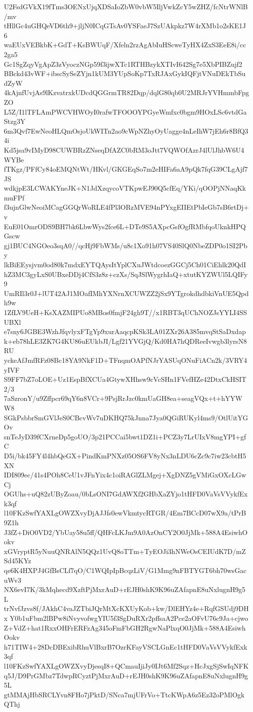 U2FsdGVkX19fTms3OENxUjqXDSaIoZbW0vbW5IljVwkZcY5wZHZ/fcNtrWNlB/mv
tHllGc4uGHQeVD6th9+jljN0ICqGTsAv0YSFaeJ7SzUAkpkz7W4rXMb1o2sKE1J6
waEUxVEBkbK+GdT+KsBWUqF/Xfeln2rzAgAbIuHScweTyHX4ZxS3EeE8i/cc2ga5
Gc1SgZqyVgApZ3zVyoczNGp59f3ijwXTc1RTHBzykXTIvI642Sg7e5XbPIBZujf2
BBckd43vWF+ibscSySeZYjn1kUM3YUpSoKp7TxRJAxGykIQFjtVNuDEkTbSudZyW
4kAjnfUvjAs9lKzvatrxkUDcdQGGrmTR82Dqp/dqlG80qb0U2MRJrYVHmmbFpgZO
L5Z/I1lTFLAmPWCVHWOyI0rafwTFOOOYPGyeWmfxc0bgm9HOxLSc6vtdGaStzg3Y
6m3Qvf7EwNeoHLQmOsjoUkWITn2ao9cWpNZhyOyUagge4nLeIhW7jEh6r8BfQ34i
Kd5jsa9vIMyD98CUWBRzZNseqDfAZC0bRM3oJtt7VQWOfAzrJ4lUlJhbW6U4WYBe
fTKgz/PFfCy84oEMQNtWt/HKvl/GKGEqSo7m2eHIFa6aA9pQk7fqG39CLgAjf7JS
wdkjpE3LCWAKYneJK+N1JdXzqycoVTKpwEJ90Q5cfEq/YKi/qOOPjNNaqKkmuFPf
f3ujnGlwNeoiMCagGGQrWoRLE4fPl3ORzMVE94nPYxgEIIEtPbIeGb7sB6rtDj+v
EuE01OmrODS9BH7bk6LbwWys2fce6L+DTe9S5AXpcGsfOgfRMbfqoUknkHPQGscw
gj1BUC4NGOeo3sqA0//qcHj9FbWMs/u8c1Xo91h07VS40SlQ0NbeZDP0o1SI2Pby
lkBiEEysjvm0od80k7mdxEYTQAysItYplCXuJWtdcoezGGCj5Ch01CiEhlk20QdI
hZ3MC3gyLxS0UBxeDDj4CfS3z8z+czXs/SqJSlWygrhIaQ+xtutKYZWUl5LQIFy9
UmRIl3r0J+lUT42AJ1MOafIMhYXNrnXCUWZZ2jSx9YTgrokdhdbkiVnUE5Qpdh9w
1ZfLV9UeH+KsXAZMIPUo8MBos0fmjF24gh9T//x1RBT3qUChNOZJsYYLI4SSUBXl
e7sny6JGBE3WzhJfqvlyxFTgYp9xurAaqcpKSk3LA01ZXr26A385mvqStSaDxdap
k+eb78hLE3ZK7G4KU86uEUkbJI/Lgf21YVGjQ/Kd0HA7hQDReeIvwgb3lyrsN8RU
yckeAfJmfRFz08Bc18YA9NkF1D+TFnqmOAPfNJrYASUqONuFiACn2k/3VRY4yIVF
S9FF7bZ7oLOE+Uz1EspBfXCUa4GtywXHhsw9cVcSHn1FVefHZe42DtxCkHSIT2/3
7aSzronY/u9Zffpcr69qY6n8VCr+9PsjRrJzc0kmUaGH8ea+seagVQx+t+hYYWW8
SGkPsbbrSmGVlJeS0CBcvWv7uDKHQ75kJnna7Jya0QGiRUKyl4ms9/OtlUitYGOv
snTeJyD39fCXrneDp5goUO/3p21PCCai5bwt1DZ1i+PCZ3y7LrUIxV8mgYPI+gfC
D5i/bk45FY4l4hbQeGX+PindKmPNXz05OS6FV8yNx3nLDU6cZc9c7iw23cbtH5XN
IDI809ec/41s4POh8CeU1vJFnYix4c1oiRAGlZLMgej+XgDNZ5gVMiGxOXcLGwCj
OGUhs+uQ82zUByZoau/0bLsONI7GdAWXf2GHbXaZYjo1tHFD0VaVsVVykfExk3qf
l10FKzSwfYAXLgOWZXvyDjAJJfs0ewVkmtycRTGR/4Em7BCcD07wX9a/tPrB9Z1h
J3fZ+DiO0VD2/YbUay58u5ff/QHFcLKJm9A0AzOnCY2O0JjMk+588A4EsiwhOokv
xGVryptR5yNuuQNRAlN5QQz1UvQ8oTTm+TyEOJi3hNWeOsCEIUdK7D/mZSd45KYz
qe6K4HXPJ4GfBsCLf7qO/C1WQIpIpBcqzLiV/G1Mmg9nFBTYGT6bh70wsGacuWv3
NX6evI7K/3kMqhecd9XzftPjMxrAuD+rEJH0shK9K96uZAfapnE8uNxlugnH9g5L
trNvfJzvs8f/JAkhC4vaJZTbiJQrMtXcKXUyKob+kw/DlEHYz4e+RqfGSUdj9DHx
Y0b1uFbm2lBPw8iNvyvofwgYIU5f3SgDuRXr2pffsaA2Pce2aOFvU76c9Ja+cjwo
Z+VdZ+hat1RxxOHFrERFzAg345oFmFbGH2RgwNaPlxqO0JjMk+588A4EsiwhOokv
h71TIW4+28DcDBExibRhuVlBxrB7OzrKFayVSCLGnEc1tHFD0VaVsVVykfExk3qf
l10FKzSwfYAXLgOWZXvyDjesqI8+QCmauIjiJy0IJt6Mf2Sqz+HcJxgSjSwIqNFK
q5J/D9PrGMbz7TdwpRCyztPjMxrAuD+rEJH0shK9K96uZAfapnE8uNxlugnH9g5L
gtMMAjHbSRCLYvn8FHo7jPktD/SNca7mjUFrVo+TtcKWpA6z5Ez32oPMlOgkQThj
